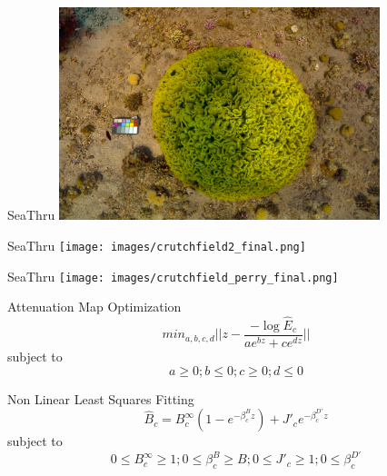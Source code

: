 \begin{frame}{SeaThru}
    \centering
    \includegraphics[height=0.7\textheight,width=0.7\textwidth,keepaspectratio]{images/crutchfield_final.jpg}
\end{frame}

\begin{frame}{SeaThru}
    \centering
    \texttt{[image: images/crutchfield2\_final.png]}
\end{frame}

\begin{frame}{SeaThru}
    \centering
    \texttt{[image: images/crutchfield\_perry\_final.png]}
\end{frame}

\begin{frame}{Attenuation Map Optimization}
    $$min_{a,b,c,d} || z - \frac{-\log{\hat{E}_c}}{ae^{bz} + ce^{dz}} ||$$
    subject to
    $$a \geq 0; b \leq 0; c \geq 0; d \leq 0$$
\end{frame}

\begin{frame}{Non Linear Least Squares Fitting}
    $$\hat{B}_c = B_c^{\infty}(1-e^{-\beta_c^B z})+J'_c e^{-\beta_c^{D'} z}$$
    subject to
    $$0 \leq B^\infty_c \geq 1; 0 \leq \beta_c^B \geq B; 0 \leq J'_c \geq 1; 0 \leq \beta_c^{D'}$$
\end{frame}



